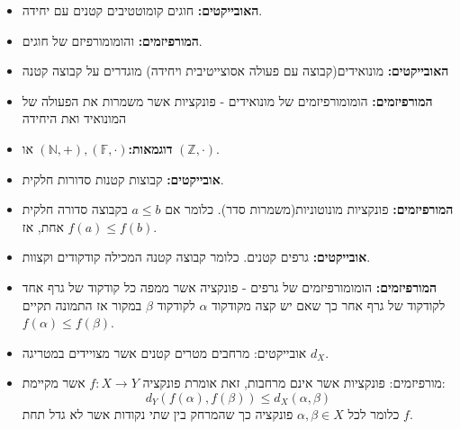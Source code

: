 \documentclass{tstextbook}
\begin{document}
\begin{definition}
  \begin{itemize}
    \item \textbf{האובייקטים:} חוגים קומוטטיבים קטנים עם יחידה.
    \item \textbf{המורפיזמים:} והומומורפיזם של חוגים.
  \end{itemize}
\end{definition}
\begin{definition}
  \begin{itemize}
    \item \textbf{האובייקטים:} מונואידים(קבוצה עם פעולה אסוצייטיבית ויחידה) מוגדרים על קבוצה קטנה
    \item \textbf{המורפיזמים:} הומומורפיזמים של מונואידים - פונקציות אשר משמרות את הפעולה של המונואיד ואת היחידה
    \item \textbf{דוגמאות:}\((\mathbb{N},+),(\mathbb{F},\cdot)\) או \((\mathbb{Z},\cdot)\).
  \end{itemize}
\end{definition}
\begin{definition}
  \begin{itemize}
    \item \textbf{אובייקטים:} קבוצות קטנות סדורות חלקית.
    \item \textbf{המורפיזמים:} פונקציות מונוטוניות(משמרות סדר). כלומר אם \(a\leq b\) בקבוצה סדורה חלקית אחת, אז \(f(a)\leq f(b)\).
  \end{itemize}
\end{definition}
\begin{definition}
  \begin{itemize}
    \item \textbf{אובייקטים:} גרפים קטנים. כלומר קבוצה קטנה המכילה קודקודים וקצוות.
    \item \textbf{המורפיזמים:} הומומורפיזמים של גרפים - פונקציה אשר ממפה כל קודקוד של גרף אחד לקודקוד של גרף אחר כך שאם יש קצה מקודקוד \(\alpha\) לקודקוד \(\beta\) במקור אז התמונה תקיים \(f(\alpha)\leq f(\beta)\). 
  \end{itemize}
\end{definition}
\begin{definition}
  \begin{itemize}
    \item אובייקטים: מרחבים מטרים קטנים אשר מצויידים במטריגה \(d_{X}\).
    \item מורפיזמים: פונקציות אשר אינם מרחבות, זאת אומרת פונקציה \(f:X\to Y\) אשר מקיימת:
$$d_{Y}(f(\alpha),f(\beta))\leq d_{X}(\alpha,\beta)$$
כלומר לכל \(\alpha,\beta \in X\) פונקציה כך שהמרחק בין שתי נקודות אשר לא גדל תחת \(f\).
  \end{itemize}
\end{definition}
\end{document}
